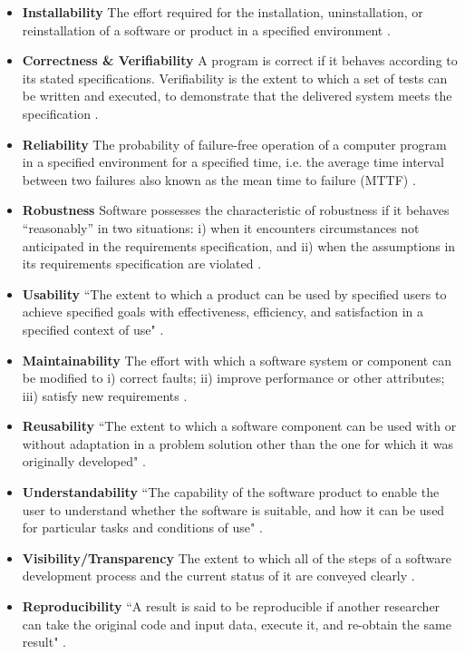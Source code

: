 \begin{itemize}
	\item \textbf{Installability} The effort required for the installation, uninstallation, or reinstallation of a software or product in a specified environment \cite{ISO/IEC25010} \cite{lenhard2013measuring}.

	\item \textbf{Correctness \& Verifiability} A program is correct if it behaves according to its stated specifications. Verifiability is the extent to which a set of tests can be written and executed, to demonstrate that the delivered system meets the specification \cite{GhezziEtAl2003}.

	\item \textbf{Reliability} The probability of failure-free operation of a computer program in a specified environment for a specified time, i.e. the average time interval between two failures also known as the mean time to failure (MTTF) \cite{musa1987software} 
	\cite{GhezziEtAl2003}.

	\item \textbf{Robustness} Software possesses the characteristic of robustness if it behaves ``reasonably'' in two situations: i) when it encounters circumstances not anticipated in the requirements specification, and ii) when the assumptions in its requirements specification are violated \cite{ghezzi1991fundamentals} \cite{boehm2007software}.

	\item \textbf{Usability} ``The extent to which a product can be used by specified users to achieve specified goals with effectiveness, efficiency, and satisfaction in a specified context of use" \cite{ISO/TR16982:2002} \cite{ISO9241-11:2018}.

	\item \textbf{Maintainability} The effort with which a software system or component can be modified to i) correct faults; ii) improve performance or other attributes; iii) satisfy new requirements \cite{IEEEStdGlossarySET1990} \cite{boehm2007software}.

	\item \textbf{Reusability} ``The extent to which a software component can be used with or without adaptation in a problem solution other than the one for which it was originally developed" \cite{kalagiakos2003non}.

	\item \textbf{Understandability} ``The capability of the software product to enable the user to understand whether the software is suitable, and how it can be used for particular tasks and conditions of use" \cite{iso2001iec}.

	\item \textbf{Visibility/Transparency} The extent to which all of the steps of a software development process and the current status of it are conveyed clearly \cite{ghezzi1991fundamentals}.

	\item \textbf{Reproducibility} ``A result is said to be reproducible if another researcher can take the original code and input data, execute it, and re-obtain the same result" \cite{BenureauAndRougier2017}.
\end{itemize}

